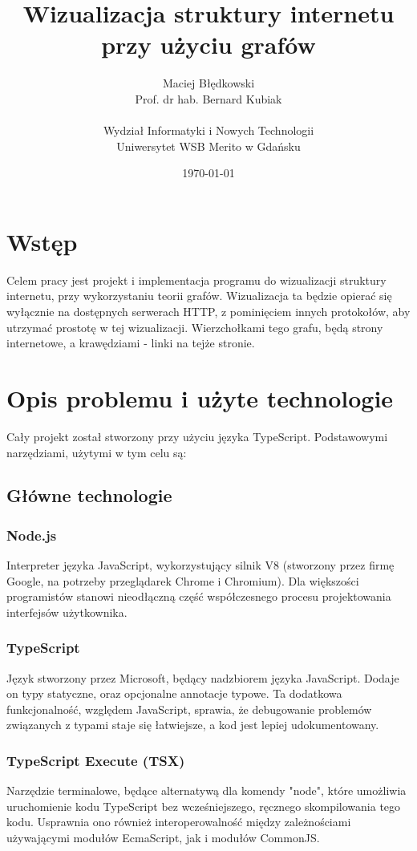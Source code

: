 \documentclass[a4paper, 12pt]{article}
\title{Wizualizacja struktury internetu przy użyciu grafów}
\author{Maciej Błędkowski \\ Prof. dr hab. Bernard Kubiak \\ \\ Wydział Informatyki i Nowych Technologii \\ Uniwersytet WSB Merito w Gdańsku}
\date{\today}
\begin{document}
\maketitle

\tableofcontents

\section{Wstęp}
Celem pracy jest projekt i implementacja programu do wizualizacji struktury internetu, przy wykorzystaniu teorii grafów. Wizualizacja ta będzie opierać się wyłącznie na dostępnych serwerach HTTP, z pominięciem innych protokołów, aby utrzymać prostotę w tej wizualizacji. Wierzchołkami tego grafu, będą strony internetowe, a krawędziami - linki na tejże stronie.

\section{Opis problemu i użyte technologie}
Cały projekt został stworzony przy użyciu języka TypeScript. Podstawowymi narzędziami, użytymi w tym celu są:

\subsection{Główne technologie}
\subsubsection{Node.js}
Interpreter języka JavaScript, wykorzystujący silnik V8 (stworzony przez firmę Google, na potrzeby przeglądarek Chrome i Chromium\cite{aboutV8Doc}).\cite{aboutNodejsDoc} Dla większości programistów stanowi nieodłączną część współczesnego procesu projektowania interfejsów użytkownika.
\subsubsection{TypeScript}
Język stworzony przez Microsoft, będący nadzbiorem języka JavaScript. Dodaje on typy statyczne, oraz opcjonalne annotacje typowe.\cite{arstechnicaTypescript} Ta dodatkowa funkcjonalność, względem JavaScript, sprawia, że debugowanie problemów związanych z typami staje się łatwiejsze, a kod jest lepiej udokumentowany.
\subsubsection{TypeScript Execute (TSX)}
Narzędzie terminalowe, będące alternatywą dla komendy "node", które umożliwia uruchomienie kodu TypeScript bez wcześniejszego, ręcznego skompilowania tego kodu. Usprawnia ono również interoperowalność między zależnościami używającymi modułów EcmaScript, jak i modułów CommonJS.\cite{npmTsxReadme}
\end{document}
